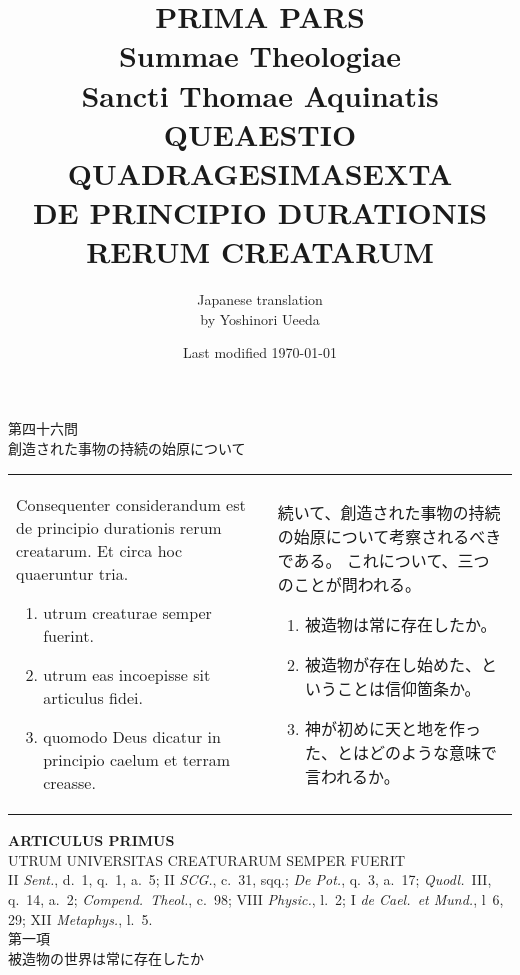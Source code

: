 \documentclass[10pt]{jsarticle} %
\title{{\bf PRIMA PARS}\\{\HUGE Summae Theologiae}\\Sancti Thomae
Aquinatis\\{\sffamily QUEAESTIO QUADRAGESIMASEXTA}\\DE PRINCIPIO
DURATIONIS RERUM CREATARUM}
\author{Japanese translation\\by Yoshinori {\sc Ueeda}}
\date{Last modified \today}
\begin{document}
\maketitle

\begin{center}
{\Large 第四十六問\\創造された事物の持続の始原について}
\end{center}

\begin{longtable}{p{21em}p{21em}}

Consequenter considerandum est de principio durationis rerum
 creatarum. Et circa hoc quaeruntur tria. 

\begin{enumerate}
 \item utrum creaturae semper fuerint. 
 \item utrum eas incoepisse sit articulus fidei. 
 \item quomodo Deus dicatur in principio caelum et terram creasse.
\end{enumerate}
&

続いて、創造された事物の持続の始原について考察されるべきである。
これについて、三つのことが問われる。
\begin{enumerate}
 \item 被造物は常に存在したか。
 \item 被造物が存在し始めた、ということは信仰箇条か。
 \item 神が初めに天と地を作った、とはどのような意味で言われるか。
\end{enumerate}

\end{longtable}


\newpage
{}

\begin{center}
 {\Large {\bf ARTICULUS PRIMUS\\ 
}}
 {\large UTRUM UNIVERSITAS CREATURARUM SEMPER FUERIT}\\
{\footnotesize II {\itshape Sent.}, d.~1, q.~1, a.~5; II {\itshape
 SCG.}, c.~31, sqq.; {\itshape De Pot.}, q.~3, a.~17; {\itshape
 Quodl.}~III, q.~14, a.~2; {\itshape Compend.~Theol.}, c.~98; VIII
 {\itshape Physic.}, l.~2; I {\itshape de Cael.~et Mund.}, l~6, 29; XII
 {\itshape Metaphys.}, l.~5.}\\
{\Large 第一項\\
被造物の世界は常に存在したか}
\end{center}
\end{document}
